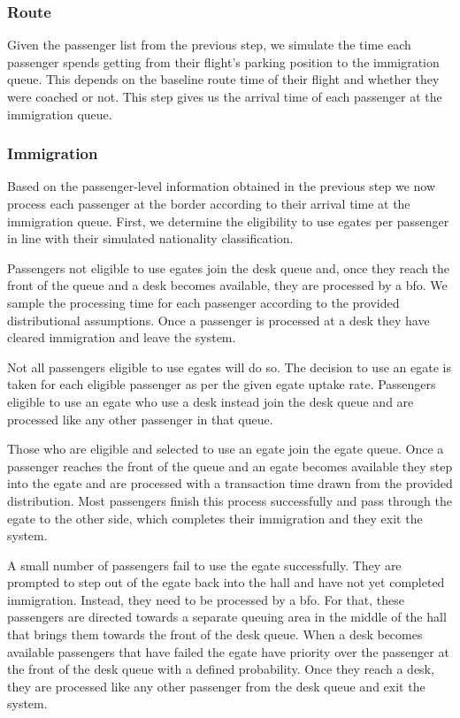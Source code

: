 \documentclass[10pt]{article}
\begin{document}
\subsubsection{Route}

Given the passenger list from the previous step, we simulate the time each passenger spends getting from their flight's parking position to the immigration queue. This depends on the baseline route time 
of their flight and whether they were coached or not. This step gives us the arrival time of each passenger at the immigration queue. 

\subsubsection{Immigration}

Based on the passenger-level information obtained in the previous step we now process each passenger at the border according to their arrival time at the immigration queue. First, we determine the eligibility to use \glspl{egate} per passenger in line with their simulated nationality classification. 

Passengers not eligible to use \glspl{egate} join the desk queue and, once they reach the front of the queue and a desk becomes available, they are processed by a \gls{bfo}. We sample the processing time for each passenger according to the provided distributional assumptions. Once a passenger is processed at a desk they have cleared immigration and leave the system.

Not all passengers eligible to use \glspl{egate} will do so. The decision to use an \gls{egate} is taken for each eligible passenger as per the given \gls{egate} uptake rate. Passengers eligible to use an \gls{egate} who use a desk instead join the desk queue and are processed like any other passenger in that queue. 

Those who are eligible and selected to use an \gls{egate} join the \gls{egate} queue. Once a passenger reaches the front of the queue and an \gls{egate} becomes available they step into the \gls{egate} and are processed with a transaction time drawn from the provided distribution. Most passengers finish this process successfully and pass through the \gls{egate} to the other side, which completes their immigration and they exit the system.

A small number of passengers fail to use the \gls{egate} successfully. They are prompted to step out of the \gls{egate} back into the hall and have not yet completed immigration. Instead, they need to be processed by a \gls{bfo}. For that, these passengers are directed towards a separate queuing area in the middle of the hall that brings them towards the front of the desk queue. When a desk becomes available passengers that have failed the \gls{egate} have priority over the passenger at the front of the desk queue with a defined probability. Once they reach a desk, they are processed like any other passenger from the desk queue and exit the system.
\end{document}

